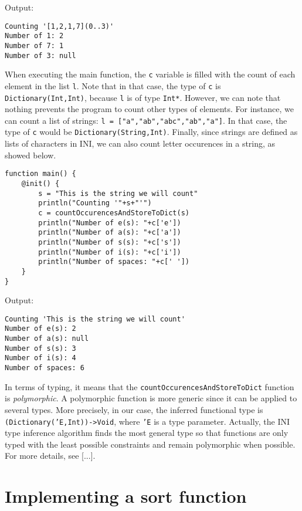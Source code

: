 \documentclass[11pt]{report}
\begin{document}
Output:

\begin{lstlisting}[numbers=none]
Counting '[1,2,1,7](0..3)'
Number of 1: 2
Number of 7: 1
Number of 3: null
\end{lstlisting}

When executing the main function, the \texttt{c} variable is filled with the count of each element in the list \texttt{l}. Note that in that case, the type of \texttt{c} is \texttt{Dictionary(Int,Int)}, because \texttt{l} is of type \texttt{Int*}. However, we can note that nothing prevents the program to count other types of elements. For instance, we can count a list of strings: \texttt{l = ["a","ab","abc","ab","a"]}. In that case, the type of \texttt{c} would be \texttt{Dictionary(String,Int)}. Finally, since strings are defined as lists of characters in INI, we can also count letter occurences in a string, as showed below.

\begin{lstlisting}
function main() {
	@init() {
		s = "This is the string we will count"
		println("Counting '"+s+"'")
		c = countOccurencesAndStoreToDict(s)
		println("Number of e(s): "+c['e'])
		println("Number of a(s): "+c['a'])
		println("Number of s(s): "+c['s'])
		println("Number of i(s): "+c['i'])
		println("Number of spaces: "+c[' '])
	}
}
\end{lstlisting}

Output:

\begin{lstlisting}[numbers=none]
Counting 'This is the string we will count'
Number of e(s): 2
Number of a(s): null
Number of s(s): 3
Number of i(s): 4
Number of spaces: 6
\end{lstlisting}

In terms of typing, it means that the \texttt{countOccurencesAndStoreToDict} function is \emph{polymorphic}. A polymorphic function is more generic since it can be applied to several types. More precisely, in our case, the inferred functional type is \texttt{(Dictionary('E,Int))->Void}, where \texttt{'E} is a type parameter. Actually, the INI type inference algorithm finds the most general type so that functions are only typed with the least possible constraints and remain polymorphic when possible. For more details, see [...].

\section{Implementing a sort function\label{sec:implementing_a_sort_function}}
\end{document}

